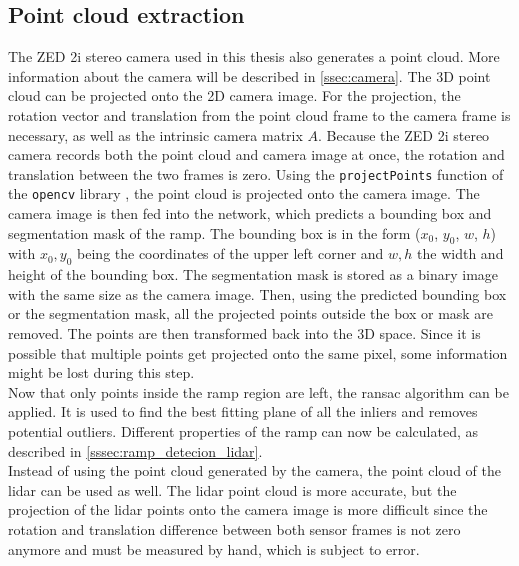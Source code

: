 \subsection{Point cloud extraction}
\label{ssec:point_cloud_extraction}
The ZED 2i stereo camera used in this thesis also generates a point cloud.
More information about the camera will be described in \cref{ssec:camera}.
The 3D point cloud can be projected onto the 2D camera image.
For the projection, the rotation vector and translation from the point cloud frame to the camera frame is necessary, as well as the intrinsic camera matrix $A$.
Because the ZED 2i stereo camera records both the point cloud and camera image at once, the rotation and translation between the two frames is zero.
Using the \texttt{projectPoints} function of the \texttt{opencv} library \cite{Bradski2000}, the point cloud is projected onto the camera image.
The camera image is then fed into the network, which predicts a bounding box and segmentation mask of the ramp.
The bounding box is in the form ($x_0$, $y_0$, $w$, $h$) with $x_0, y_0$ being the coordinates of the upper left corner and $w, h$ the width and height of the bounding box.
The segmentation mask is stored as a binary image with the same size as the camera image.
Then, using the predicted bounding box or the segmentation mask, all the projected points outside the box or mask are removed.
The points are then transformed back into the 3D space.
Since it is possible that multiple points get projected onto the same pixel, some information might be lost during this step.\\
Now that only points inside the ramp region are left, the \gls{ransac} algorithm can be applied.
It is used to find the best fitting plane of all the inliers and removes potential outliers.
Different properties of the ramp can now be calculated, as described in \cref{sssec:ramp_detecion_lidar}.\\
Instead of using the point cloud generated by the camera, the point cloud of the \gls{lidar} can be used as well.
The \gls{lidar} point cloud is more accurate, but the projection of the \gls{lidar} points onto the camera image is more difficult since the rotation and translation difference between both sensor frames is not zero anymore and must be measured by hand, which is subject to error.